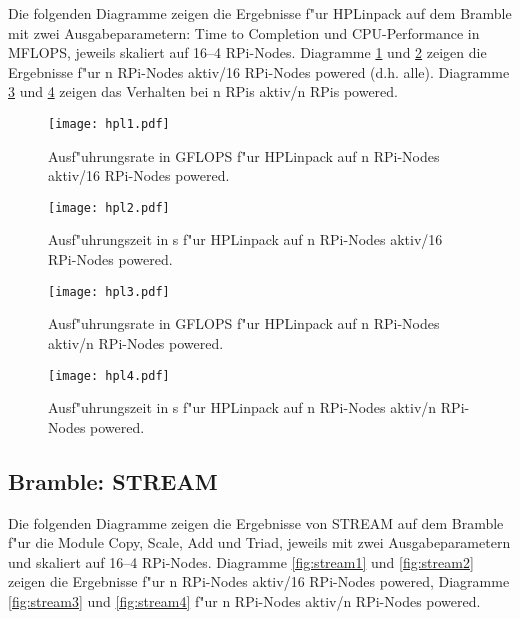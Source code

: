 Die folgenden Diagramme zeigen die Ergebnisse f"ur HPLinpack auf dem Bramble mit zwei Ausgabeparametern: Time to Completion und CPU-Performance in MFLOPS, jeweils skaliert auf 16--4 RPi-Nodes. Diagramme \ref{fig:hpl1} und \ref{fig:hpl2} zeigen die Ergebnisse f"ur n RPi-Nodes aktiv/16 RPi-Nodes powered (d.h. alle). Diagramme \ref{fig:hpl3} und \ref{fig:hpl4} zeigen das Verhalten bei n RPis aktiv/n RPis powered.
\enlargethispage*{2cm}
\begin{figure}[htb]
  \centering
  \texttt{[image: hpl1.pdf]}\\ 
  \caption{Ausf"uhrungsrate in GFLOPS f"ur HPLinpack auf n RPi-Nodes aktiv/16 RPi-Nodes powered.}
  \label{fig:hpl1}		
\end{figure}
\begin{figure}[h!]
  \centering
  \texttt{[image: hpl2.pdf]}\\ 
  \caption{Ausf"uhrungszeit in s f"ur HPLinpack auf n RPi-Nodes aktiv/16 RPi-Nodes powered.}
  \label{fig:hpl2}		
\end{figure}
\begin{figure}[htb]
  \centering
  \texttt{[image: hpl3.pdf]}\\ 
  \caption{Ausf"uhrungsrate in GFLOPS f"ur HPLinpack auf n RPi-Nodes aktiv/n RPi-Nodes powered.}
  \label{fig:hpl3}		
\end{figure}
\begin{figure}[h!]
  \centering
  \texttt{[image: hpl4.pdf]}\\ 
  \caption{Ausf"uhrungszeit in s f"ur HPLinpack auf n RPi-Nodes aktiv/n RPi-Nodes powered.}
  \label{fig:hpl4}		
\end{figure}

\newpage
\subsection{Bramble: STREAM}\label{ergebnisse-stream}
Die folgenden Diagramme zeigen die Ergebnisse von STREAM auf dem Bramble f"ur die Module Copy, Scale, Add und Triad, jeweils mit zwei Ausgabeparametern und skaliert auf 16--4 RPi-Nodes. Diagramme \ref{fig:stream1} und \ref{fig:stream2} zeigen die Ergebnisse f"ur n RPi-Nodes aktiv/16 RPi-Nodes powered, Diagramme \ref{fig:stream3} und \ref{fig:stream4} f"ur n RPi-Nodes aktiv/n RPi-Nodes powered. 

